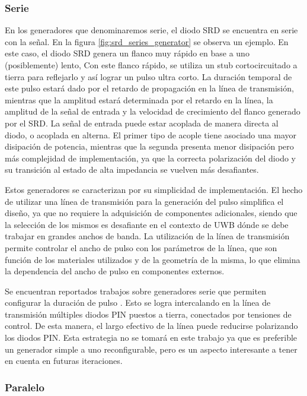 \subsubsection{Serie}

En los generadores que denominaremos serie, el diodo SRD se encuentra en serie
con la señal. En la figura \ref{fig:srd_series_generator} se observa un ejemplo.
En este caso, el diodo SRD genera un flanco muy rápido en base a uno
(posiblemente) lento, Con este flanco rápido, se utiliza un stub cortocircuitado
a tierra para reflejarlo y así lograr un pulso ultra corto. La duración temporal
de este pulso estará dado por el retardo de propagación en la línea de
transmisión, mientras que la amplitud estará determinada por el retardo en la
línea, la amplitud de la señal de entrada y la velocidad de crecimiento del
flanco generado por el SRD. La señal de entrada puede estar acoplada de manera
directa al diodo, o acoplada en alterna. El primer tipo de acople tiene asociado
una mayor disipación de potencia, mientras que la segunda presenta menor
disipación pero más complejidad de implementación, ya que la correcta
polarización del diodo y su transición al estado de alta impedancia se vuelven
más desafiantes.

Estos generadores se caracterizan por su simplicidad de implementación. El hecho
de utilizar una línea de transmisión para la generación del pulso simplifica el
diseño, ya que no requiere la adquisición de componentes adicionales, siendo que
la selección de los mismos es desafiante en el contexto de UWB dónde se debe
trabajar en grandes anchos de banda. La utilización de la línea de transmisión
permite controlar el ancho de pulso con los parámetros de la línea, que son
función de los materiales utilizados y de la geometría de la misma, lo que
elimina la dependencia del ancho de pulso en componentes externos.

Se encuentran reportados trabajos sobre generadores serie que permiten
configurar la duración de pulso \cite{Zhang2006}. Esto se logra intercalando en
la línea de transmisión múltiples diodos PIN puestos a tierra, conectados por
tensiones de control. De esta manera, el largo efectivo de la línea puede
reducirse polarizando los diodos PIN. Esta estrategia no se tomará en este
trabajo ya que es preferible un generador simple a uno reconfigurable, pero es
un aspecto interesante a tener en cuenta en futuras iteraciones.

\subsubsection{Paralelo}

